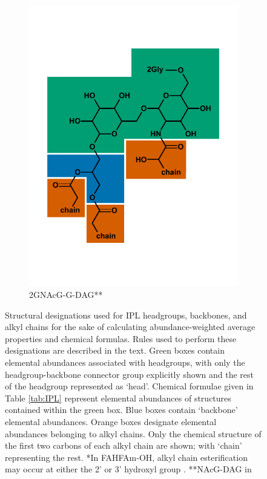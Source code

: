 \begin{figure}[h]
\begin{subfigure}[b]{.3\linewidth}
        \includegraphics[width=\linewidth]{figs_ch1/2GNAcG-G-DAG}
    	\caption{2GNAcG-G-DAG**}
        \label{fig:2GNAcG-G-DAG}
    \end{subfigure}

    
\caption[Structural designations used for IPL headgroups, backbones, and alkyl chains]{Structural designations used for IPL headgroups, backbones, and alkyl chains for the sake of calculating abundance-weighted average properties and chemical formulas. Rules used to perform these designations are described in the text. Green boxes contain elemental abundances associated with headgroups, with only the headgroup-backbone connector group explicitly shown and the rest of the headgroup represented as `head'. Chemical formulae given in Table \ref{tab:IPL} represent elemental abundances of structures contained within the green box. Blue boxes contain `backbone' elemental abundances. Orange boxes designate elemental abundances belonging to alkyl chains. Only the chemical structure of the first two carbons of each alkyl chain are shown; with `chain' representing the rest. *In FAHFAm-OH, alkyl chain esterification may occur at either the 2' or 3' hydroxyl group \citep{diercks2015accumulation}. **NAcG-DAG in \cite{schubotz2013spatial}}
\label{fig:IPLdivision}
\end{figure}
\doublespace



